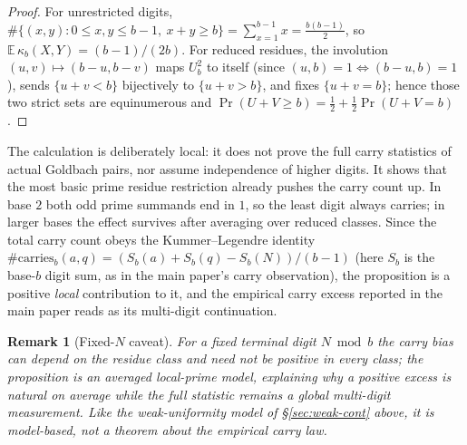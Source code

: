 \documentclass[11pt]{article}
\newtheorem{remark}{Remark}
\begin{document}
\begin{proof}
For unrestricted digits,
$\#\{(x,y):0\le x,y\le b-1,\ x+y\ge b\}=\sum_{x=1}^{b-1}x=\tfrac{b(b-1)}2$, so
$\mathbb E\,\kappa_b(X,Y)=(b-1)/(2b)$. For reduced residues, the involution
$(u,v)\mapsto(b-u,b-v)$ maps $U_b^2$ to itself (since $(u,b)=1\iff(b-u,b)=1$), sends
$\{u+v<b\}$ bijectively to $\{u+v>b\}$, and fixes $\{u+v=b\}$; hence those two strict sets are
equinumerous and $\Pr(U+V\ge b)=\tfrac12+\tfrac12\Pr(U+V=b)$.
\end{proof}

The calculation is deliberately local: it does not prove the full carry statistics of actual
Goldbach pairs, nor assume independence of higher digits. It shows that the most basic prime
residue restriction already pushes the carry count up. In base $2$ both odd prime summands end
in $1$, so the least digit always carries; in larger bases the effect survives after averaging
over reduced classes. Since the total carry count obeys the Kummer--Legendre identity
$\#\mathrm{carries}_b(a,q)=(S_b(a)+S_b(q)-S_b(N))/(b-1)$ (here $S_b$ is the base-$b$ digit sum, as
in the main paper's carry observation), the proposition is a positive \emph{local} contribution to
it, and the empirical carry excess reported in the main paper reads as its multi-digit
continuation.

\begin{remark}[Fixed-$N$ caveat]
For a fixed terminal digit $N\bmod b$ the carry bias can depend on the residue class and need
not be positive in every class; the proposition is an averaged local-prime model, explaining
why a positive excess is natural \emph{on average} while the full statistic remains a global
multi-digit measurement. Like the weak-uniformity model of \S\ref{sec:weak-cont} above, it is
model-based, not a theorem about the empirical carry law.
\end{remark}
\end{document}
